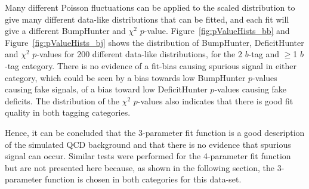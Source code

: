 Many different Poisson fluctuations can be applied to the scaled distribution to give many different data-like distributions that can be fitted,
and each fit will give a different BumpHunter and $\chi^{2}$ $p$-value.
Figure~\ref{fig:pValueHists_bb} and Figure~\ref{fig:pValueHists_bj} shows the distribution of BumpHunter, DeficitHunter and $\chi^{2}$ $p$-values for 200 different data-like distributions,
for the 2 $b$-tag and $\geq$1 $b$-tag category.
There is no evidence of a fit-bias causing spurious signal in either category,
which could be seen by a bias towards low BumpHunter $p$-values causing fake signals,
of a bias toward low DeficitHunter $p$-values causing fake deficits.
The distribution of the $\chi^{2}$ $p$-values also indicates that there is good fit quality in both tagging categories.

Hence, it can be concluded that the 3-parameter fit function is a good description of the simulated QCD background
and that there is no evidence that spurious signal can occur.
Similar tests were performed for the 4-parameter fit function but are not presented here because,
as shown in the following section,
the 3-parameter function is chosen in both categories for this data-set.

